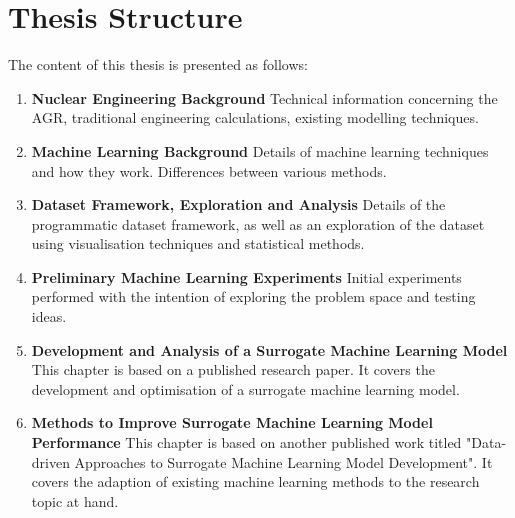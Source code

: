 \section{Thesis Structure}

The content of this thesis is presented as follows:

\begin{enumerate} 
	
	\item \textbf{Nuclear Engineering Background} Technical information concerning the AGR, traditional engineering calculations, existing modelling techniques. 
	
	\item \textbf{Machine Learning Background} Details of machine learning techniques and how they work. Differences between various methods.
	
	\item \textbf{Dataset Framework, Exploration and Analysis} Details of the programmatic dataset framework, as well as an exploration of the dataset using visualisation techniques and statistical methods.
	
	\item \textbf{Preliminary Machine Learning Experiments} Initial experiments performed with the intention of exploring the problem space and testing ideas. 
	
	\item \textbf{Development and Analysis of a Surrogate Machine Learning Model} This chapter is based on a published research paper. It covers the development and optimisation of a surrogate machine learning model. 
	
	\item \textbf{Methods to Improve Surrogate Machine Learning Model Performance} This chapter is based on another published work titled "Data-driven Approaches to Surrogate Machine Learning Model Development". It covers the adaption of existing machine learning methods to the research topic at hand.
		
\end{enumerate}
	
	


